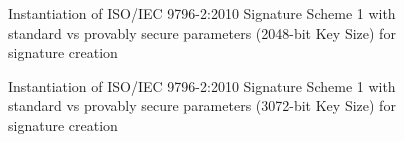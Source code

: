 \documentclass[]{final_report}
\theoremstyle{definition}
\begin{document}
\begin{figure}[H]
    \centering %
     \caption{Instantiation of ISO/IEC 9796-2:2010 Signature Scheme 1 with standard vs provably secure parameters (2048-bit Key Size) for signature creation}
    \begin{minipage}{\textwidth}
        \centering
    \end{minipage}
            \label{iso_sign_2048bit_table}
  \end{figure}
  
\begin{figure}[H]
    \centering %
     \caption{Instantiation of ISO/IEC 9796-2:2010 Signature Scheme 1 with standard vs provably secure parameters (3072-bit Key Size) for signature creation}
    \begin{minipage}{\textwidth}
        \centering
    \end{minipage}
         \label{iso_sign_3072bit_table}
\end{figure}
\end{document}
